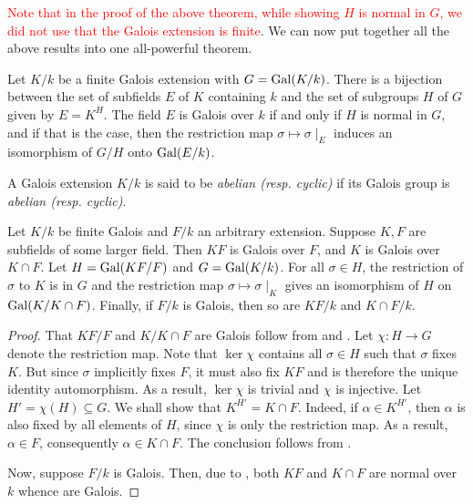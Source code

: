 \textcolor{red}{Note that in the proof of the above theorem, while showing $H$ is normal in $G$, we did not use that the Galois extension is finite}. We can now put together all the above results into one all-powerful theorem.

\begin{theorem}
    Let $K/k$ be a finite Galois extension with $G = \operatorname{Gal}(K/k)$. There is a bijection between the set of subfields $E$ of $K$ containing $k$ and the set of subgroups $H$ of $G$ given by $E = K^H$. The field $E$ is Galois over $k$ if and only if $H$ is normal in $G$, and if that is the case, then the restriction map $\sigma\mapsto\sigma\mid_E$ induces an isomorphism of $G/H$ onto $\operatorname{Gal}(E/k)$.
\end{theorem}

\begin{definition}
    A Galois extension $K/k$ is said to be \textit{abelian (resp. cyclic)} if its Galois group is \textit{abelian (resp. cyclic)}.
\end{definition}

\begin{theorem}
    Let $K/k$ be finite Galois and $F/k$ an arbitrary extension. Suppose $K, F$ are subfields of some larger field. Then $KF$ is Galois over $F$, and $K$ is Galois over $K\cap F$. Let $H = \operatorname{Gal}(KF/F)$ and $G = \operatorname{Gal}(K/k)$. For all $\sigma\in H$, the restriction of $\sigma$ to $K$ is in $G$ and the restriction map $\sigma\mapsto\sigma\mid_K$ gives an isomorphism of $H$ on $\operatorname{Gal}(K/K\cap F)$. Finally, if $F/k$ is Galois, then so are $KF/k$ and $K\cap F/k$.
\end{theorem}
\begin{proof}
    That $KF/F$ and $K/K\cap F$ are Galois follow from  and . Let $\chi: H\to G$ denote the restriction map. Note that $\ker\chi$ contains all $\sigma\in H$ such that $\sigma$ fixes $K$. But since $\sigma$ implicitly fixes $F$, it must also fix $KF$ and is therefore the unique identity automorphism. As a result, $\ker\chi$ is trivial and $\chi$ is injective. Let $H' = \chi(H)\subseteq G$. We shall show that $K^{H'} = K\cap F$. Indeed, if $\alpha\in K^{H'}$, then $\alpha$ is also fixed by all elements of $H$, since $\chi$ is only the restriction map. As a result, $\alpha\in F$, consequently $\alpha\in K\cap F$. The conclusion follows from .

    Now, suppose $F/k$ is Galois. Then, due to , both $KF$ and $K\cap F$ are normal over $k$ whence are Galois.
\end{proof}


